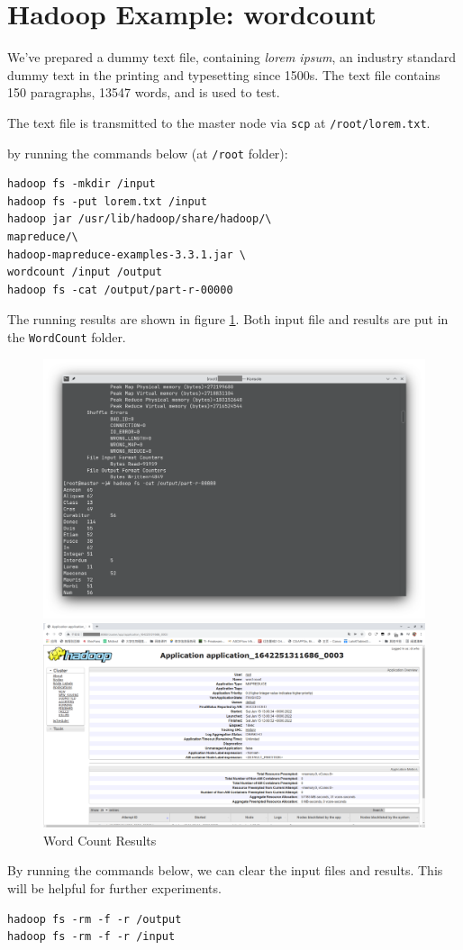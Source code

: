 \section{Hadoop Example: wordcount}

We've prepared a dummy text file, containing \emph{lorem ipsum}, an industry standard dummy text in the printing and typesetting since 1500s. The text file contains 150 paragraphs, 13547 words, and is used to test.

The text file is transmitted to the master node via \texttt{scp} at \texttt{/root/lorem.txt}.

by running the commands below (at \texttt{/root} folder):

\begin{verbatim}
hadoop fs -mkdir /input
hadoop fs -put lorem.txt /input
hadoop jar /usr/lib/hadoop/share/hadoop/\
mapreduce/\
hadoop-mapreduce-examples-3.3.1.jar \
wordcount /input /output
hadoop fs -cat /output/part-r-00000
\end{verbatim}

The running results are shown in figure \ref{fig:word-count}. Both input file and results are put in the \texttt{WordCount} folder.

\begin{figure}[ht]
    \centering
    \includegraphics[width=\figurewidth]{figure/word-count.png}
    
    \includegraphics[width=\figurewidth]{figure/mapreduce.png}
    \caption{Word Count Results}
    \label{fig:word-count}
\end{figure}

By running the commands below, we can clear the input files and results. This will be helpful for further experiments.

\begin{verbatim}
hadoop fs -rm -f -r /output
hadoop fs -rm -f -r /input
\end{verbatim}